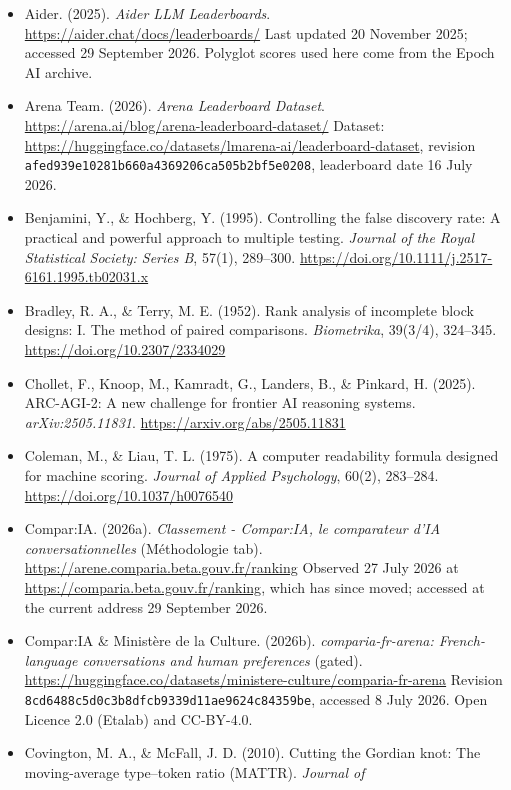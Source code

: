 \documentclass[
]{article}
\providecommand{\tightlist}{%
  \setlength{\itemsep}{0pt}\setlength{\parskip}{0pt}}
\begin{document}
\begin{itemize}
\tightlist
\item
  Aider. (2025). \emph{Aider LLM Leaderboards}.
  \url{https://aider.chat/docs/leaderboards/} Last updated 20 November
  2025; accessed 29 September 2026. Polyglot scores used here come from
  the Epoch AI archive.
\item
  Arena Team. (2026). \emph{Arena Leaderboard Dataset}.
  \url{https://arena.ai/blog/arena-leaderboard-dataset/} Dataset:
  \url{https://huggingface.co/datasets/lmarena-ai/leaderboard-dataset},
  revision \texttt{afed939e10281b660a4369206ca505b2bf5e0208}, leaderboard
  date 16 July 2026.
\item
  Benjamini, Y., \& Hochberg, Y. (1995). Controlling the false discovery
  rate: A practical and powerful approach to multiple testing.
  \emph{Journal of the Royal Statistical Society: Series B}, 57(1),
  289--300. \url{https://doi.org/10.1111/j.2517-6161.1995.tb02031.x}
\item
  Bradley, R. A., \& Terry, M. E. (1952). Rank analysis of incomplete
  block designs: I. The method of paired comparisons. \emph{Biometrika},
  39(3/4), 324--345. \url{https://doi.org/10.2307/2334029}
\item
  Chollet, F., Knoop, M., Kamradt, G., Landers, B., \& Pinkard, H.
  (2025). ARC-AGI-2: A new challenge for frontier AI reasoning systems.
  \emph{arXiv:2505.11831}. \url{https://arxiv.org/abs/2505.11831}
\item
  Coleman, M., \& Liau, T. L. (1975). A computer readability formula
  designed for machine scoring. \emph{Journal of Applied Psychology},
  60(2), 283--284. \url{https://doi.org/10.1037/h0076540}
\item
  Compar:IA. (2026a). \emph{Classement - Compar:IA, le comparateur d'IA
  conversationnelles} (Méthodologie tab).
  \url{https://arene.comparia.beta.gouv.fr/ranking} Observed 27 July 2026
  at \url{https://comparia.beta.gouv.fr/ranking}, which has since moved;
  accessed at the current address 29 September 2026.
\item
  Compar:IA \& Ministère de la Culture. (2026b).
  \emph{comparia-fr-arena: French-language conversations and human
  preferences} (gated).
  \url{https://huggingface.co/datasets/ministere-culture/comparia-fr-arena}
  Revision \texttt{8cd6488c5d0c3b8dfcb9339d11ae9624c84359be}, accessed 8
  July 2026. Open Licence 2.0 (Etalab) and CC-BY-4.0.
\item
  Covington, M. A., \& McFall, J. D. (2010). Cutting the Gordian knot:
  The moving-average type--token ratio (MATTR). \emph{Journal of
}
\end{itemize}
\end{document}
